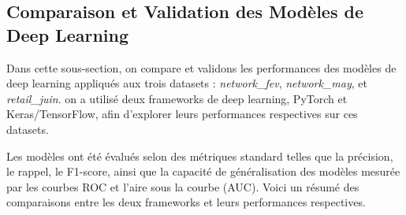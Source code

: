 \subsection{Comparaison et Validation des Modèles de Deep Learning}

Dans cette sous-section, on compare et validons les performances des modèles de deep learning appliqués aux trois datasets : \textit{network\_fev}, \textit{network\_may}, et \textit{retail\_juin}. on a utilisé deux frameworks de deep learning, PyTorch et Keras/TensorFlow, afin d'explorer leurs performances respectives sur ces datasets.

Les modèles ont été évalués selon des métriques standard telles que la précision, le rappel, le F1-score, ainsi que la capacité de généralisation des modèles mesurée par les courbes ROC et l'aire sous la courbe (AUC). Voici un résumé des comparaisons entre les deux frameworks et leurs performances respectives.

